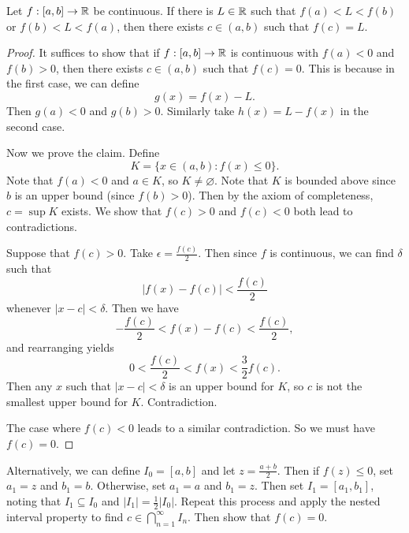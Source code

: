 \begin{theorem}
  Let $f : [a, b] \to \mathbb{R}$ be continuous. If there is
  $L \in \mathbb{R}$
  such that $f(a) < L < f(b)$ or $f(b) < L < f(a)$,
  then there exists $c \in (a, b)$ such that $f(c) = L$.
\end{theorem}

\begin{proof}[Proof]
  It suffices to show that if $f : [a, b] \to \mathbb{R}$ is
  continuous with $f(a) < 0$ and $f(b) > 0$, then
  there exists $c \in (a, b)$ such that $f(c) = 0$.
  This is because in the first case, we can define
  \[g(x) = f(x) - L.\]
  Then $g(a) < 0$ and $g(b) > 0$. Similarly take
  $h(x) = L - f(x)$ in the second case.

  Now we prove the claim. Define
  \[K = \{x \in (a, b) : f(x) \le 0\}.\]
  Note that $f(a) < 0$ and $a \in K$, so
  $K \ne \varnothing$. Note that $K$ is bounded above
  since $b$ is an upper bound (since $f(b) > 0$).
  Then by the axiom of completeness,
  $c = \sup K$ exists. We show that $f(c) > 0$ and
  $f(c) < 0$ both lead to contradictions.

  Suppose that $f(c) > 0$. Take
  $\epsilon = \frac{f(c)}{2}$. Then since $f$ is
  continuous, we can find
  $\delta$ such that
  \[|f(x) - f(c)| < \frac{f(c)}{2}\]
  whenever $|x - c| < \delta$. Then we have
  \[-\frac{f(c)}{2} < f(x) - f(c) < \frac{f(c)}{2},\]
  and rearranging yields
  \[0 < \frac{f(c)}{2} < f(x) < \frac{3}{2}f(c).\]
  Then any $x$ such that $|x - c| < \delta$ is an
  upper bound for $K$, so $c$ is not the smallest upper
  bound for $K$. Contradiction.

  The case where $f(c) < 0$ leads to a similar
  contradiction. So we must have $f(c) = 0$.
\end{proof}

\begin{remark}
  Alternatively, we can define $I_0 = [a, b]$ and let
  $z = \frac{a + b}{2}$. Then if $f(z) \le 0$,
  set $a_1 = z$ and $b_1 = b$. Otherwise, set $a_1 = a$
  and $b_1 = z$. Then set $I_1 = [a_1, b_1]$, noting
  that $I_1 \subseteq I_0$ and $|I_1| = \frac{1}{2}|I_0|$.
  Repeat this process and apply the nested interval
  property to find $c \in \bigcap_{n = 1}^\infty I_n$.
  Then show that $f(c) = 0$.
\end{remark}
